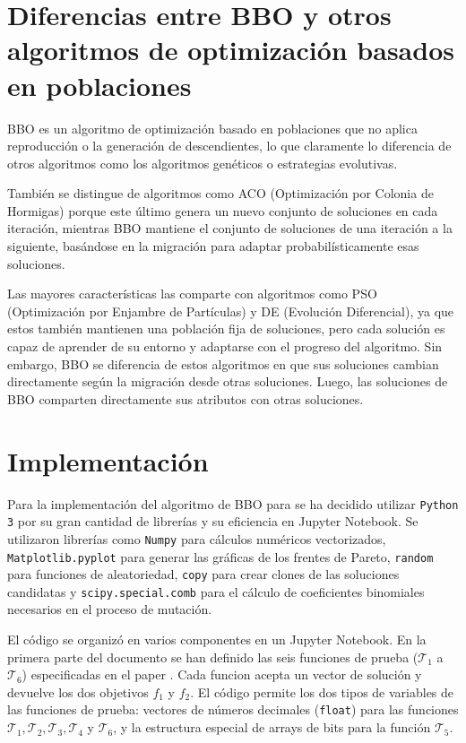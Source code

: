 \documentclass{article}
\begin{document}
\section{Diferencias entre BBO y otros algoritmos de optimización basados en poblaciones}

BBO es un algoritmo de optimización basado en poblaciones que no aplica reproducción o la generación de descendientes, lo que claramente lo diferencia de otros algoritmos como los algoritmos genéticos o estrategias evolutivas.

También se distingue de algoritmos como ACO (Optimización por Colonia de Hormigas) porque este último genera un nuevo conjunto de soluciones en cada iteración, mientras BBO mantiene el conjunto de soluciones de una iteración a la siguiente, basándose en la migración para adaptar probabilísticamente esas soluciones.

Las mayores características las comparte con algoritmos como PSO (Optimización por Enjambre de Partículas) y DE (Evolución Diferencial), ya que estos también mantienen una población fija de soluciones, pero cada solución es capaz de aprender de su entorno y adaptarse con el progreso del algoritmo.
Sin embargo, BBO se diferencia de estos algoritmos en que sus soluciones cambian directamente según la migración desde otras soluciones. Luego, las soluciones de BBO comparten directamente sus atributos con otras soluciones.

\section{Implementación}
\label{sec:meta2_implementacion}
Para la implementación del algoritmo de BBO para se ha decidido utilizar \verb|Python 3| por su gran cantidad de librerías y su eficiencia en Jupyter Notebook. Se utilizaron librerías como \verb|Numpy| para cálculos numéricos vectorizados, \verb|Matplotlib.pyplot| para generar las gráficas de los frentes de Pareto, \verb|random| para funciones de aleatoriedad, \verb|copy| para crear clones de las soluciones candidatas y \verb|scipy.special.comb| para el cálculo de coeficientes binomiales necesarios en el proceso de mutación.

El código se organizó en varios componentes en un Jupyter Notebook. En la primera parte del documento se han definido las seis funciones de prueba ($\mathcal{T}_1$ a $\mathcal{T}_6$) especificadas en el paper . Cada funcion acepta un vector de solución y devuelve los dos objetivos $f_1$ y $f_2$. El código permite los dos tipos de variables de las funciones de prueba: vectores de números decimales (\verb|float|) para las funciones $\mathcal{T}_1, \mathcal{T}_2, \mathcal{T}_3, \mathcal{T}_4$ y $\mathcal{T}_6$, y la estructura especial de arrays de bits para la función $\mathcal{T}_5$.
\end{document}
